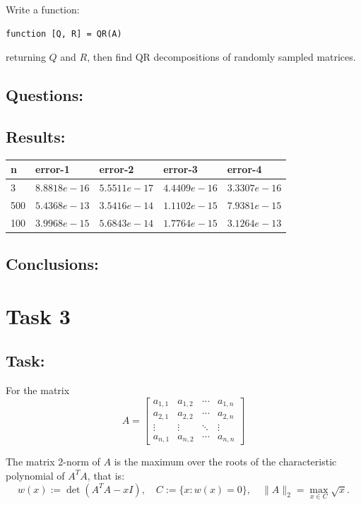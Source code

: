 \documentclass[a4paper, 11pt]{article}
\begin{document}
Write a function:
\begin{center}
\begin{verbatim}
function [Q, R] = QR(A)
\end{verbatim}
\end{center}
returning \( Q \) and \( R \), then find QR decompositions of randomly sampled matrices.

\subsection{Questions:} 

\subsection{Results:} 
\begin{center}
\begin{tabular}{|l|l|l|l|l|}
\hline
n   & error-1       & error-2       & error-3       & error-4       \\ \hline
3   & $8.8818e-16$ & $5.5511e-17$ & $4.4409e-16$ & $3.3307e-16$ \\ \hline
500 & $5.4368e-13$ & $3.5416e-14$ & $1.1102e-15$ & $7.9381e-15$ \\ \hline
100 & $3.9968e-15$ & $5.6843e-14$ & $1.7764e-15$ & $3.1264e-13$ \\ \hline
\end{tabular}
\end{center}
\subsection{Conclusions:}

\section{Task 3}
\subsection{Task:}
For the matrix
\[
A = \begin{bmatrix}
a_{1,1} & a_{1,2} & \cdots & a_{1,n} \\
a_{2,1} & a_{2,2} & \cdots & a_{2,n} \\
\vdots & \vdots & \ddots & \vdots \\
a_{n,1} & a_{n,2} & \cdots & a_{n,n}
\end{bmatrix}
\]

The matrix 2-norm of \( A \) is the maximum over the roots of the characteristic polynomial of \( A^T A \), that is:
\[
w(x) := \det(A^T A - x I), \quad C := \{ x : w(x) = 0 \}, \quad \|A\|_2 = \max_{x \in C} \sqrt{x}.
\]
\end{document}
